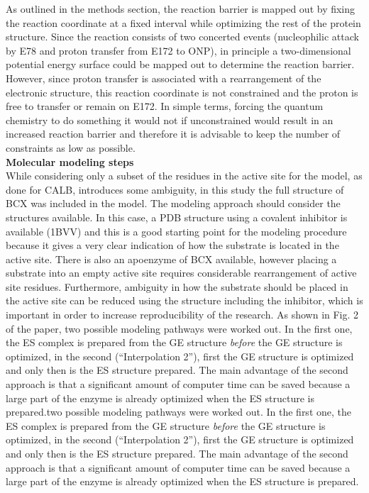 As outlined in the methods section, the reaction barrier is mapped out by fixing the reaction coordinate at a fixed interval while optimizing the rest of the protein structure.
Since the reaction consists of two concerted events (nucleophilic attack by E78 and proton transfer from E172 to ONP), in principle a two-dimensional potential energy surface could be mapped out to determine the reaction barrier.
However, since proton transfer is associated with a rearrangement of the electronic structure, this reaction coordinate is not constrained and the proton is free to transfer or remain on E172.
In simple terms, forcing the quantum chemistry to do something it would not if unconstrained would result in an increased reaction barrier and therefore it is advisable to keep the number of constraints as low as possible.\\
\textbf{Molecular modeling steps}\\
While considering only a subset of the residues in the active site for the model, as done for CALB, introduces some ambiguity, in this study the full structure of BCX was included in the model.
The modeling approach should consider the structures available.
In this case, a PDB structure using a covalent inhibitor is available (1BVV) and this is a good starting point for the modeling procedure because it gives a very clear indication of how the substrate is located in the active site.
There is also an apoenzyme of BCX available, however placing a substrate into an empty active site requires considerable rearrangement of active site residues.
Furthermore, ambiguity in how the substrate should be placed in the active site can be reduced using the structure including the inhibitor, which is important in order to increase reproducibility of the research.
As shown in Fig. 2 of the paper, two possible modeling pathways were worked out.
In the first one, the ES complex is prepared from the GE structure \textit{before} the GE structure is optimized, in the second (``Interpolation 2''), first the GE structure is optimized and only then is the ES structure prepared.
The main advantage of the second approach is that a significant amount of computer time can be saved because a large part of the enzyme is already optimized when the ES structure is prepared.two possible modeling pathways were worked out.
In the first one, the ES complex is prepared from the GE structure \textit{before} the GE structure is optimized, in the second (``Interpolation 2''), first the GE structure is optimized and only then is the ES structure prepared.
The main advantage of the second approach is that a significant amount of computer time can be saved because a large part of the enzyme is already optimized when the ES structure is prepared.


